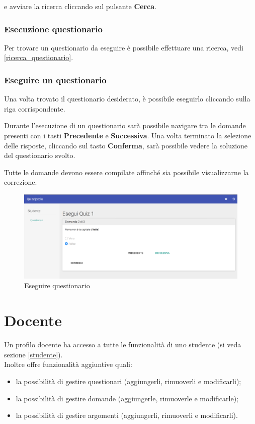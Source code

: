 \documentclass[12pt,a4paper]{article}
\begin{document}
	e avviare la ricerca cliccando sul pulsante \textbf{Cerca}.
	
	
	\subsubsection{Esecuzione questionario}
	Per trovare un questionario da eseguire è possibile effettuare una ricerca, vedi \ref{ricerca_questionario}.
	\subsubsection{Eseguire un questionario}
	\par Una volta trovato il questionario desiderato, è possibile eseguirlo cliccando sulla riga corrispondente. \\
	\par Durante l'esecuzione di un questionario sarà possibile navigare tra le domande presenti con i tasti \textbf{Precedente} e \textbf{Successiva}.
	Una volta terminato la selezione delle risposte, cliccando sul tasto \textbf{Conferma}, sarà possibile vedere la soluzione del questionario svolto. \\
	\par Tutte le domande devono essere compilate affinché sia possibile visualizzarne la correzione. \\
	
	\begin{figure}[H]	
		\centering
		\includegraphics[width=1.0\linewidth]{../img/screenshot/esecuzioneQuestionario.png}
		\caption{Eseguire questionario}
		\label{Eseguire questionario}
	\end{figure}
	
	\section{Docente}\label{docente}
	Un profilo docente ha accesso a tutte le funzionalità di uno studente (si veda sezione \ref{studente}). \\
		Inoltre offre funzionalità aggiuntive quali:
		\begin{itemize}
			\item la possibilità di gestire questionari (aggiungerli, rimuoverli e modificarli);
			\item la possibilità di gestire domande (aggiungerle, rimuoverle e modificarle);
			\item la possibilità di gestire argomenti (aggiungerli, rimuoverli e modificarli).
		\end{itemize}
\end{document}
